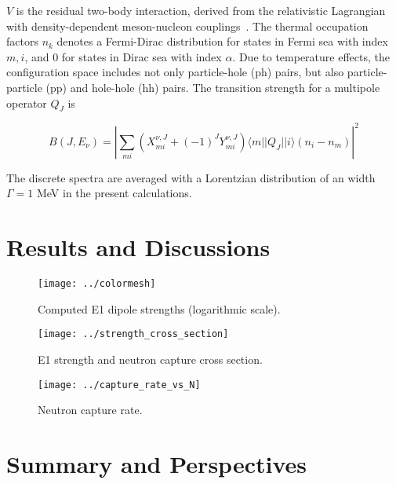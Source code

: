 \documentclass[prc,twocolumn,twoside,showpacs,superscriptaddress,floatfix]{revtex4-1}
\begin{document}
$V$ is the residual two-body interaction, derived from the relativistic
Lagrangian with  density-dependent meson-nucleon couplings~\cite{Niksic}.
The
thermal occupation factors $n_k$ denotes a Fermi-Dirac distribution for states
in Fermi sea with index $m,i$, and $0$ for states in Dirac sea with index
$\alpha$.
Due to temperature effects, the configuration space includes not only
particle-hole (ph) pairs, but also particle-particle (pp) and hole-hole (hh)
pairs.
The transition strength for a multipole operator $Q_J$ is

\begin{equation}
   B(J,E_\nu) = \left | \sum_{mi} (X^{\nu,J}_{mi} +
   (-1)^J Y^{\nu,J}_{mi} ) \langle m || Q_J || i\rangle (n_i
   -n_m) \right |^2
\end{equation}

The discrete spectra are averaged with a Lorentzian distribution of an width
$\Gamma = 1 $ MeV in the present calculations.




\section{Results and Discussions}\label{sec:results}


\begin{figure}[htp]
\centering
\texttt{[image: ../colormesh]}
\caption{\label{fig:e1}Computed E1 dipole strengths (logarithmic scale).}
\end{figure}

\begin{figure}[htp]
\centering
\texttt{[image: ../strength\_cross\_section]}
\caption{\label{fig:e1_xsec}E1 strength and neutron capture cross section.}
\end{figure}

\begin{figure}[htp]
\centering
\texttt{[image: ../capture\_rate\_vs\_N]}
\caption{\label{fig:neutron_capture}Neutron capture rate.}
\end{figure}

\section{Summary and Perspectives}\label{sec:summary}
\end{document}
